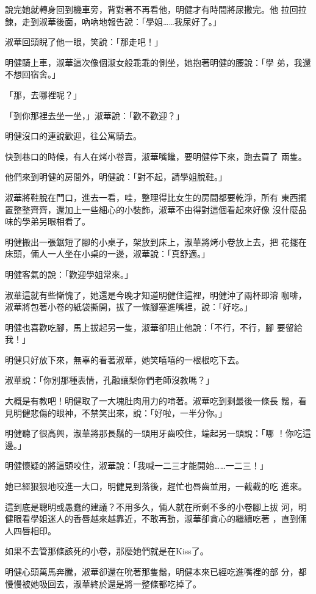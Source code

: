 說完她就轉身回到機車旁，背對著不再看他，明健才有時間將尿撒完。他
拉回拉鍊，走到淑華後面，吶吶地報告說：「學姐……我尿好了。」

淑華回頭睨了他一眼，笑說：「那走吧！」

明健騎上車，淑華這次像個淑女般乖乖的側坐，她抱著明健的腰說：「學
弟，我還不想回宿舍。」

「那，去哪裡呢？」

「到你那裡去坐一坐，」淑華說：「歡不歡迎？」

明健沒口的連說歡迎，往公寓騎去。

快到巷口的時候，有人在烤小卷賣，淑華嘴饞，要明健停下來，跑去買了
兩隻。

他們來到明健的房間外，明健說：「對不起，請學姐脫鞋。」

淑華將鞋脫在門口，進去一看，哇，整理得比女生的房間都要乾淨，所有
東西擺置整整齊齊，還加上一些細心的小裝飾，淑華不由得對這個看起來好像
沒什麼品味的學弟另眼相看了。

明健搬出一張鋸短了腳的小桌子，架放到床上，淑華將烤小卷放上去，把
花擺在床頭，倆人一人坐在小桌的一邊，淑華說：「真舒適。」

明健客氣的說：「歡迎學姐常來。」

淑華這就有些慚愧了，她還是今晚才知道明健住這裡，明健沖了兩杯即溶
咖啡，淑華將包著小卷的紙袋撕開，拔了一條腳塞進嘴裡，說：「好吃。」

明健也喜歡吃腳，馬上拔起另一隻，淑華卻阻止他說：「不行，不行，腳
要留給我！」

明健只好放下來，無辜的看著淑華，她笑嘻嘻的一根根吃下去。

淑華說：「你別那種表情，孔融讓梨你們老師沒教嗎？」

大概是有教吧！明健取了一大塊肚肉用力的啃著。淑華吃到剩最後一條長
鬚，看見明健悲傷的眼神，不禁笑出來，說：「好啦，一半分你。」

明健聽了很高興，淑華將那長鬚的一頭用牙齒咬住，端起另一頭說：「哪
！你吃這邊。」

明健懷疑的將這頭咬住，淑華說：「我喊一二三才能開始……一二三！」

她已經狠狠地咬進一大口，明健見到落後，趕忙也唇齒並用，一截截的吃
進來。

這到底是聰明或愚蠢的建議？不用多久，倆人就在所剩不多的小卷腳上拔
河，明健眼看學姐迷人的香唇越來越靠近，不敢再動，淑華卻貪心的繼續吃著
，直到倆人四唇相印。

如果不去管那條該死的小卷，那麼她們就是在Kiss了。

明健心頭萬馬奔騰，淑華卻還在吮著那隻鬚，明健本來已經吃進嘴裡的部
分，都慢慢被她吸回去，淑華終於還是將一整條都吃掉了。

